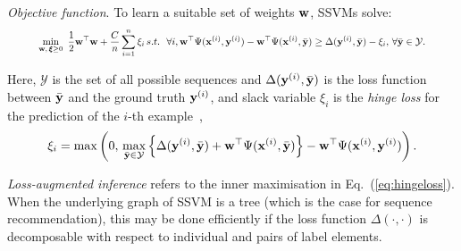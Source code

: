 \emph{Objective function}.
To learn a suitable set of weights $\mathbf{w}$, SSVMs solve: %
\begin{equation}
\label{eq:nslack}
\resizebox{0.9\linewidth}{!}{$\displaystyle
\begin{aligned}
\min_{\w, \, \bm{\xi} \ge 0} ~\frac{1}{2} \w^\top \w + \frac{C}{n} \sum_{i=1}^n \xi_i \, s.t.~~  \forall i, 
  \w^\top \Psi(\x^{(i)}, \y^{(i)}) - \w^\top \Psi(\x^{(i)}, \bar{\y}) \ge
  \Delta(\y^{(i)}, \bar{\y}) - \xi_i, \, \forall \bar\y \in \mathcal{Y}.
\end{aligned}
$}
\end{equation}

Here, 
$\mathcal{Y}$ is the set of all possible sequences
and $\Delta(\mathbf{y}^{(i)}, \bar{\mathbf{y}})$ is the loss function between $\bar{\mathbf{y}}$ and the ground truth $\mathbf{y}^{(i)}$,
and slack variable $\xi_i$ is the \emph{hinge loss} for the prediction of the $i$-th example~\cite{tsochantaridis2005large},
\begin{equation}
\label{eq:hingeloss}
\xi_i = \max \left( 0, \, 
        \max_{\bar{\mathbf{y}} \in \mathcal{Y}}
        \left\{ \Delta(\mathbf{y}^{(i)}, \bar{\mathbf{y}}) + \mathbf{w}^\top \Psi(\mathbf{x}^{(i)}, \bar{\mathbf{y}}) \right\} - \mathbf{w}^\top \Psi(\mathbf{x}^{(i)}, \mathbf{y}^{(i)}) \right).
\end{equation}

\emph{Loss-augmented inference} refers to the inner maximisation in Eq.~(\ref{eq:hingeloss}).
When the underlying graph of SSVM is a tree (which is the case for sequence recommendation),
this may be done efficiently if the loss function $\Delta(\cdot,\cdot)$ is decomposable
with respect to individual and pairs of label elements.

